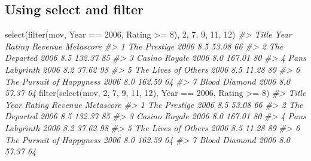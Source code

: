 \documentclass[
]{book}
\newenvironment{Shaded}{\begin{snugshade}}{\end{snugshade}}
\newcommand{\CommentTok}[1]{\textcolor[rgb]{0.56,0.35,0.01}{\textit{#1}}}
\newcommand{\DecValTok}[1]{\textcolor[rgb]{0.00,0.00,0.81}{#1}}
\newcommand{\FunctionTok}[1]{\textcolor[rgb]{0.00,0.00,0.00}{#1}}
\newcommand{\NormalTok}[1]{#1}
\newcommand{\SpecialCharTok}[1]{\textcolor[rgb]{0.00,0.00,0.00}{#1}}
\begin{document}
\hypertarget{using-select-and-filter}{%
\subsection{Using select and filter}\label{using-select-and-filter}}

\begin{Shaded}
\begin{Highlighting}[]
\FunctionTok{select}\NormalTok{(}\FunctionTok{filter}\NormalTok{(mov, Year }\SpecialCharTok{==} \DecValTok{2006}\NormalTok{, Rating }\SpecialCharTok{\textgreater{}=} \DecValTok{8}\NormalTok{), }\DecValTok{2}\NormalTok{, }\DecValTok{7}\NormalTok{, }\DecValTok{9}\NormalTok{, }\DecValTok{11}\NormalTok{, }\DecValTok{12}\NormalTok{)}
\CommentTok{\#\textgreater{}                      Title Year Rating Revenue Metascore}
\CommentTok{\#\textgreater{} 1             The Prestige 2006    8.5   53.08        66}
\CommentTok{\#\textgreater{} 2             The Departed 2006    8.5  132.37        85}
\CommentTok{\#\textgreater{} 3            Casino Royale 2006    8.0  167.01        80}
\CommentTok{\#\textgreater{} 4          Pan\textquotesingle{}s Labyrinth 2006    8.2   37.62        98}
\CommentTok{\#\textgreater{} 5      The Lives of Others 2006    8.5   11.28        89}
\CommentTok{\#\textgreater{} 6 The Pursuit of Happyness 2006    8.0  162.59        64}
\CommentTok{\#\textgreater{} 7            Blood Diamond 2006    8.0   57.37        64}
\FunctionTok{filter}\NormalTok{(}\FunctionTok{select}\NormalTok{(mov, }\DecValTok{2}\NormalTok{, }\DecValTok{7}\NormalTok{, }\DecValTok{9}\NormalTok{, }\DecValTok{11}\NormalTok{, }\DecValTok{12}\NormalTok{), Year }\SpecialCharTok{==} \DecValTok{2006}\NormalTok{, Rating }\SpecialCharTok{\textgreater{}=} \DecValTok{8}\NormalTok{)}
\CommentTok{\#\textgreater{}                      Title Year Rating Revenue Metascore}
\CommentTok{\#\textgreater{} 1             The Prestige 2006    8.5   53.08        66}
\CommentTok{\#\textgreater{} 2             The Departed 2006    8.5  132.37        85}
\CommentTok{\#\textgreater{} 3            Casino Royale 2006    8.0  167.01        80}
\CommentTok{\#\textgreater{} 4          Pan\textquotesingle{}s Labyrinth 2006    8.2   37.62        98}
\CommentTok{\#\textgreater{} 5      The Lives of Others 2006    8.5   11.28        89}
\CommentTok{\#\textgreater{} 6 The Pursuit of Happyness 2006    8.0  162.59        64}
\CommentTok{\#\textgreater{} 7            Blood Diamond 2006    8.0   57.37        64}
\end{Highlighting}
\end{Shaded}
\end{document}
